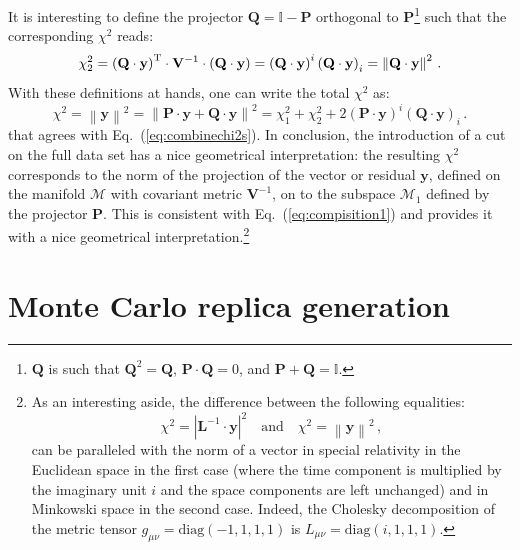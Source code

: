 \documentclass[10pt,a4paper]{article}
\begin{document}
It is interesting to define the projector
$\mathbf{Q}=\mathbb{I}-\mathbf{P}$ orthogonal to
$\mathbf{P}$\footnote{$\mathbf{Q}$ is such that
  $\mathbf{Q}^2=\mathbf{Q}$, $\mathbf{P}\cdot\mathbf{Q}=0$, and
  $\mathbf{P}+\mathbf{Q}=\mathbb{I}$.} such that the corresponding
$\chi^2$ reads:
\begin{equation}
  \chi^2_{2} = \left(\mathbf{Q}\cdot \mathbf{y}\right)^{\rm T}\cdot \mathbf{V}^{-1}\cdot \left(\mathbf{Q}\cdot \mathbf{y}\right) =\left(\mathbf{Q}\cdot \mathbf{y}\right)^i \left(\mathbf{Q}\cdot \mathbf{y}\right)_i =\left\|\mathbf{Q}\cdot\mathbf{y}\right\|^2\,.
\end{equation}
With these definitions at hands, one can write the total $\chi^2$ as:
\begin{equation}
  \chi^2= \left\|\mathbf{y}\right\|^2 = \left\|\mathbf{P}\cdot\mathbf{y}+\mathbf{Q}\cdot\mathbf{y}\right\|^2 = \chi^2_{1} + \chi^2_{2} + 2 \left(\mathbf{P}\cdot \mathbf{y}\right)^i \left(\mathbf{Q}\cdot \mathbf{y}\right)_i\,.
\end{equation}
that agrees with Eq.~(\ref{eq:combinechi2s}). In conclusion, the
introduction of a cut on the full data set has a nice geometrical
interpretation: the resulting $\chi^2$ corresponds to the norm of the
projection of the vector or residual $\mathbf{y}$, defined on the
manifold $\mathcal{M}$ with covariant metric $\mathbf{V}^{-1}$, on to
the subspace $\mathcal{M}_1$ defined by the projector
$\mathbf{P}$. This is consistent with Eq.~(\ref{eq:compisition1}) and
provides it with a nice geometrical interpretation.\footnote{As an
  interesting aside, the difference between the following equalities:
$$
\chi^2 = \left|\mathbf{L}^{-1}\cdot
  \mathbf{y}\right|^2\quad\mbox{and}\quad \chi^2= \left\|\mathbf{y}\right\|^2\,,
$$
can be paralleled with the norm of a vector in special relativity in
the Euclidean space in the first case (where the time component is
multiplied by the imaginary unit $i$ and the space components are left
unchanged) and in Minkowski space in the second case. Indeed, the
Cholesky decomposition of the metric tensor
$g_{\mu\nu}=\mbox{diag}(-1,1,1,1)$ is
$L_{\mu\nu}=\mbox{diag}(i,1,1,1)$.}

\section{Monte Carlo replica generation}
\end{document}
